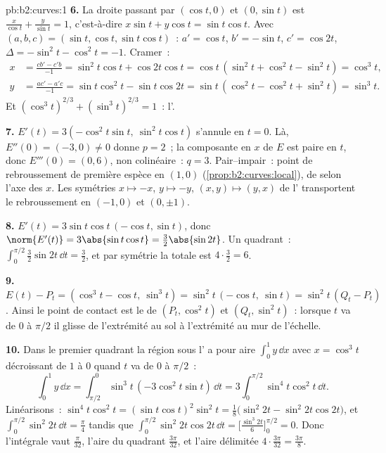 \begin{solution}{pb:b2:curves:1}
\textbf{6.} La droite passant par $(\cos t, 0)$ et $(0, \sin t)$
est $\frac x{\cos t} + \frac y{\sin t} = 1$, c'est-à-dire $x\sin t +
y\cos t = \sin t\cos t$. Avec $(a, b, c) = (\sin t, \cos t,
\sin t\cos t)$~: $a' = \cos t$, $b' = -\sin t$, $c' = \cos
2t$, $\Delta = -\sin^2 t - \cos^2 t = -1$. Cramer~:
\begin{align*}
x &= \frac{cb' - c'b}{-1} = \sin^2 t\cos t + \cos 2t\cos t
= \cos t\,(\sin^2 t + \cos^2 t - \sin^2 t) = \cos^3 t,\\
y &= \frac{ac' - a'c}{-1} = \sin t\cos^2 t - \sin t\cos 2t
= \sin t\,(\cos^2 t - \cos^2 t + \sin^2 t) = \sin^3 t .
\end{align*}
Et $(\cos^3t)^{2/3} + (\sin^3t)^{2/3} = 1$~: l'.

\textbf{7.} $E'(t) = 3(-\cos^2 t\sin t,\ \sin^2 t\cos t)$
s'annule en $t = 0$. Là, $E''(0) = (-3, 0) \neq 0$ donne
$p = 2$~; la composante en $x$ de $E$ est paire en $t$, donc
$E'''(0) = (0, 6)$, non colinéaire~: $q = 3$. Pair--impair~:
point de rebroussement de première espèce en $(1, 0)$
(\cref{prop:b2:curves:local}), de  selon l'axe des
$x$. Les symétries $x \mapsto -x$, $y \mapsto -y$, $(x,
y) \mapsto (y, x)$ de l' transportent le rebroussement en
$(-1, 0)$ et $(0, \pm1)$.

\textbf{8.} $E'(t) = 3\sin t\cos t\,(-\cos t, \sin t)$, donc
$\norm{E'(t)} = 3\abs{\sin t\cos t} = \tfrac32\abs{\sin 2t}$.
Un quadrant~: $\int_0^{\pi/2}\tfrac32\sin 2t\,\dd t =
\tfrac32$, et par symétrie la  totale est $4 \cdot
\tfrac32 = 6$.

\textbf{9.} $E(t) - P_t = (\cos^3 t - \cos t,\ \sin^3 t) =
\sin^2 t\,(-\cos t,\ \sin t) = \sin^2 t\,(Q_t - P_t)$. Ainsi le
point de contact est le  de $(P_t, \cos^2 t)$ et
$(Q_t, \sin^2 t)$~: lorsque $t$ va de $0$ à $\pi/2$ il glisse
de l'extrémité au sol à l'extrémité au mur de l'échelle.

\textbf{10.} Dans le premier quadrant la région sous
l' a pour aire $\int_0^1 y\,\dd x$ avec $x = \cos^3 t$
décroissant de $1$ à $0$ quand $t$ va de $0$ à $\pi/2$~:
\[
\int_0^1 y\,\dd x
= \int_{\pi/2}^{0}\sin^3 t\,(-3\cos^2 t\sin t)\,\dd t
= 3\int_0^{\pi/2}\sin^4 t\cos^2 t\,\dd t .
\]
Linéarisons~: $\sin^4 t\cos^2 t = (\sin t\cos t)^2\sin^2 t =
\tfrac18\bigl(\sin^2 2t - \sin^2 2t\cos 2t\bigr)$, et
$\int_0^{\pi/2}\sin^2 2t\,\dd t = \tfrac\pi4$ tandis que
$\int_0^{\pi/2}\sin^2 2t\cos 2t\,\dd t =
\bigl[\tfrac{\sin^3 2t}6\bigr]_0^{\pi/2} = 0$. Donc
l'intégrale vaut $\tfrac\pi{32}$, l'aire du quadrant
$\tfrac{3\pi}{32}$, et l'aire délimitée $4 \cdot
\tfrac{3\pi}{32} = \tfrac{3\pi}8$.


\end{solution}
